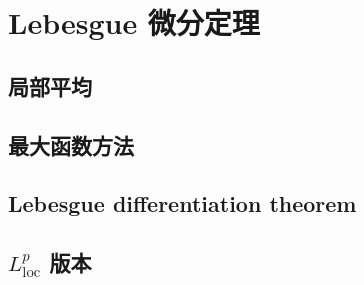 \section{Lebesgue 微分定理}
\label{b1:sec:1402}


\subsection{局部平均}
\label{b1:subsec:140201}

\subsection{最大函数方法}
\label{b1:subsec:140202}

\subsection{Lebesgue differentiation theorem}
\label{b1:subsec:140203}

\subsection{\texorpdfstring{\(L^p_{\mathrm{loc}}\)}{Lp} 版本}
\label{b1:subsec:140204}


